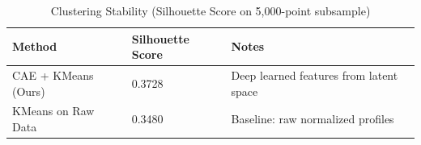 \begin{table}[H]
\caption{Clustering Stability (Silhouette Score on 5,000-point subsample)}
\begin{center}
\begin{tabular}{l l l}
\toprule
\textbf{Method} & \textbf{Silhouette Score} & \textbf{Notes} \\
\midrule
CAE + KMeans (Ours) & 0.3728 & Deep learned features from latent space \\
KMeans on Raw Data & 0.3480 & Baseline: raw normalized profiles \\
\bottomrule
\end{tabular}
\end{center}
\end{table}
